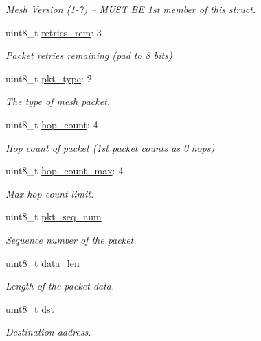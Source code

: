 \begin{DoxyCompactItemize}
\begin{DoxyCompactList}\small\item\em Mesh Version (1-\/7) -- M\+U\+ST BE 1st member of this struct. \end{DoxyCompactList}\item 
uint8\+\_\+t \hyperlink{struct____attribute_____aebb84f16b4d46a3b2ea267e8b77c8774}{retries\+\_\+rem}\+: 3
\begin{DoxyCompactList}\small\item\em Packet retries remaining (pad to 8 bits) \end{DoxyCompactList}\item 
uint8\+\_\+t \hyperlink{struct____attribute_____ae19c7dcebf79b994d537fecf3cc931c9}{pkt\+\_\+type}\+: 2
\begin{DoxyCompactList}\small\item\em The type of mesh packet. \end{DoxyCompactList}\item 
uint8\+\_\+t \hyperlink{struct____attribute_____a80f0ddbd42fa6974b08feea40867db68}{hop\+\_\+count}\+: 4
\begin{DoxyCompactList}\small\item\em Hop count of packet (1st packet counts as 0 hops) \end{DoxyCompactList}\item 
uint8\+\_\+t \hyperlink{struct____attribute_____a73ca3679f26c67143ed190411c8347c6}{hop\+\_\+count\+\_\+max}\+: 4
\begin{DoxyCompactList}\small\item\em Max hop count limit. \end{DoxyCompactList}\item 
uint8\+\_\+t \hyperlink{struct____attribute_____acb75fb96c08ce6b43afc75f54e0d6a32}{pkt\+\_\+seq\+\_\+num}
\begin{DoxyCompactList}\small\item\em Sequence number of the packet. \end{DoxyCompactList}\item 
uint8\+\_\+t \hyperlink{struct____attribute_____a963d3c197770f024e680a0d0a774c99e}{data\+\_\+len}
\begin{DoxyCompactList}\small\item\em Length of the packet data. \end{DoxyCompactList}\item 
uint8\+\_\+t \hyperlink{struct____attribute_____a3522c1d748831637cd29787e401f670b}{dst}
\begin{DoxyCompactList}\small\item\em Destination address. \end{DoxyCompactList}\item 

\end{DoxyCompactItemize}
